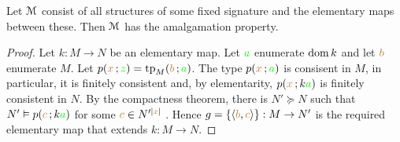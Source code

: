 \documentclass[creche.tex]{subfiles}
\begin{document}
\begin{proposition}\label{prop_elementary_amalg}
Let $\EuScript M$ consist of all structures of some fixed signature and the elementary maps between these.
Then $\EuScript M$ has the amalgamation property.
\end{proposition}

\begin{proof}
Let $k:M\to N$ be an elementary map.
Let ${\color{green} a}$ enumerate $\mathop{\rm dom} k$ and let ${\color{brown} b}$ enumerate $M$.
Let $p({\color{brown} x}\,;{\color{green} z})={\rm tp}_M({\color{brown} b}\,;{\color{green} a})$.
The type $p({\color{brown} x}\,;{\color{green} a})$ is consisent in $M$, in particular, it is finitely consistent and, by elementarity,  $p({\color{brown} x}\,;k{\color{green} a})$ is finitely consistent in $N$.
By the compactness theorem, there is $N'\succeq N$ such that $N'\vDash p({\color{brown} c}\,;k{\color{green} a})$ for some ${\color{brown} c}\in N'^{|{\color{brown} x}|}$ .
Hence $g=\{\langle{\color{brown}b},{\color{brown} c}\rangle\}:M\to N'$ is the required elementary map that extends $k:M\to N$.
\end{proof}
% 
% 
% 
% 
%    
% 
\end{document}
